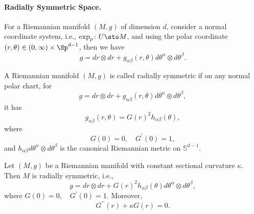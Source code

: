\paragraph{Radially Symmetric Space.} For a Riemannian manifold $(M,g)$ of dimension $d$, consider a normal coordinate system, i.e., $\exp_p \colon U \sto M$, and using the polar coordinate $(r,\theta) \in (0,\infty) \times \Sp^{d-1}$, then we have
\begin{equation*}
    g = dr \otimes dr + g_{\alpha \beta}(r,\theta)d\theta^\alpha \otimes d\theta^\beta.
\end{equation*}
\begin{defn}
    A Riemannian manifold $(M,g)$ is called radially symmetric if on any normal polar chart, for 
    \begin{equation*}
        g = dr \otimes dr + g_{\alpha \beta}(r,\theta)d\theta^\alpha \otimes d\theta^\beta,
    \end{equation*}
    it has
    \begin{equation*}
        g_{\alpha \beta}(r,\theta) = G(r)^2h_{\alpha \beta}(\theta),
    \end{equation*}
    where
    \begin{equation*}
        G(0) = 0,\quad G^\prime(0) = 1,
    \end{equation*}
    and $h_{\alpha \beta}d\theta^\alpha \otimes d\theta^\beta$ is the canonical Riemannian metric on $\mathbb{S}^{d-1}$.
\end{defn}
\begin{prop}
    Let $(M,g)$ be a Riemannian manifold with constant sectional curvature $\kappa$. Then $M$ is radially symmetric, i.e.,
    \begin{equation*}
        g = dr \otimes dr + G(r)^2h_{\alpha \beta}(\theta)d\theta^\alpha \otimes d\theta^\beta,
    \end{equation*}
    where $ G(0) = 0,\quad G^\prime(0) = 1$. Moreover,
    \begin{equation*}
        G^{\prime\prime}(r) + \kappa G(r) = 0.
    \end{equation*}
\end{prop}
